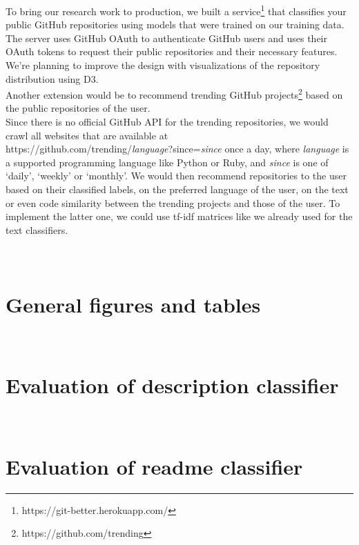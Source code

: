 \documentclass[%
a4paper,
DIV12,
2.5headlines,
bigheadings,
titlepage,
openbib,
]{scrartcl}
\begin{document}
To bring our research work to production, we built a service\footnote{https://git-better.herokuapp.com/} that classifies your public GitHub repositories using models that were trained on our training data.
The server uses GitHub OAuth to authenticate GitHub users and uses their OAuth tokens to request their public repositories and their necessary features.
We're planning to improve the design with visualizations of the repository distribution using D3.\\
Another extension would be to recommend trending GitHub projects\footnote{https://github.com/trending} based on the public repositories of the user.\\
Since there is no official GitHub API for the trending repositories, we would crawl all websites that are available at \\
https://github.com/trending/\textit{language}?since=\textit{since} once a day, where \textit{language} is a supported programming language like Python or Ruby, and \textit{since} is one of `daily', `weekly' or `monthly'.
We would then recommend repositories to the user based on their classified labels, on the preferred language of the user, on the text or even code similarity between the trending projects and those of the user.
To implement the latter one, we could use tf-idf matrices like we already used for the text classifiers.


\newpage
\appendix
\section{\\General figures and tables} \label{App:AppendixA}

\FloatBarrier

\FloatBarrier

\newpage
\section{\\Evaluation of description classifier} \label{App:AppendixB}

\FloatBarrier

\FloatBarrier

\newpage
\section{\\Evaluation of readme classifier} \label{App:AppendixC}
\end{document}
